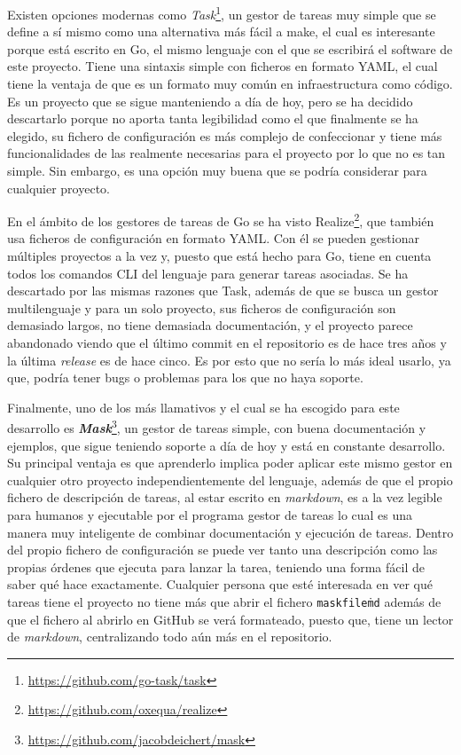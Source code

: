 Existen opciones modernas como
\textit{Task}\footnote{\url{https://github.com/go-task/task}}, un gestor de
tareas muy simple que se define a sí mismo como una alternativa más fácil a
make, el cual es interesante porque está escrito en Go, el mismo lenguaje con el
que se escribirá el software de este proyecto. Tiene una sintaxis simple con
ficheros en formato YAML, el cual tiene la ventaja de que es un formato muy
común en infraestructura como código. Es un proyecto que se sigue manteniendo a
día de hoy, pero se ha decidido descartarlo porque no aporta tanta legibilidad
como el que finalmente se ha elegido, su fichero de configuración es más
complejo de confeccionar y tiene más funcionalidades de las realmente necesarias
para el proyecto por lo que no es tan simple. Sin embargo, es una opción muy
buena que se podría considerar para cualquier proyecto.

En el ámbito de los gestores de tareas de Go se ha visto
Realize\footnote{\url{https://github.com/oxequa/realize}}, que también usa
ficheros de configuración en formato YAML. Con él se pueden gestionar múltiples
proyectos a la vez y, puesto que está hecho para Go, tiene en cuenta todos los
comandos CLI del lenguaje para generar tareas asociadas. Se ha descartado por
las mismas razones que Task, además de que se busca un gestor multilenguaje y
para un solo proyecto, sus ficheros de configuración son demasiado largos, no
tiene demasiada documentación, y el proyecto parece abandonado viendo que el
último commit en el repositorio es de hace tres años y la última
\textit{release} es de hace cinco. Es por esto que no sería lo más ideal usarlo,
ya que, podría tener bugs o problemas para los que no haya soporte.

Finalmente, uno de los más llamativos y el cual se ha escogido para este
desarrollo es
\textbf{\textit{Mask}}\footnote{\url{https://github.com/jacobdeichert/mask}}, un
gestor de tareas simple, con buena documentación y ejemplos, que sigue teniendo
soporte a día de hoy y está en constante desarrollo. Su principal ventaja es que
aprenderlo implica poder aplicar este mismo gestor en cualquier otro proyecto
independientemente del lenguaje, además de que el propio fichero de descripción
de tareas, al estar escrito en \textit{markdown}, es a la vez legible para
humanos y ejecutable por el programa gestor de tareas lo cual es una manera muy
inteligente de combinar documentación y ejecución de tareas. Dentro del propio
fichero de configuración se puede ver tanto una descripción como las propias
órdenes que ejecuta para lanzar la tarea, teniendo una forma fácil de saber qué
hace exactamente. Cualquier persona que esté interesada en ver qué tareas tiene
el proyecto no tiene más que abrir el fichero \texttt{maskfile\.md} además de
que el fichero al abrirlo en GitHub se verá formateado, puesto que, tiene un
lector de \textit{markdown}, centralizando todo aún más en el repositorio.

